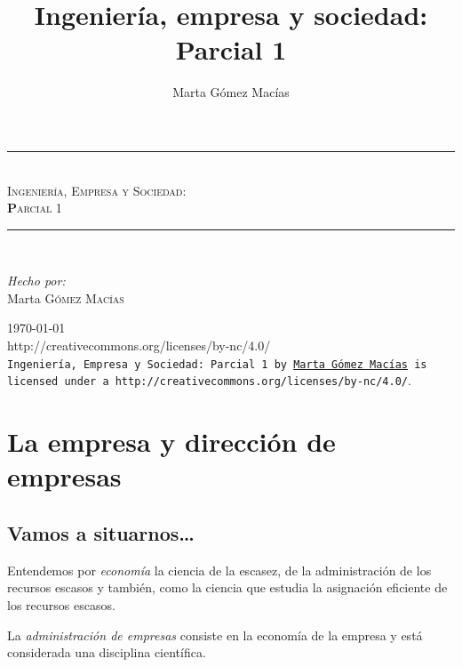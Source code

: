 \documentclass[12pt,a4paper,spanish]{report}
\title{Ingeniería, empresa y sociedad: \\ Parcial 1}
\author{Marta Gómez Macías}
\newcommand{\HRule}{\rule{\linewidth}{0.5mm}} %
\begin{document}
	 
	\begin{titlepage}
		\begin{center}
			\HRule \\[0.4cm]
			\textsc{\LARGE \textcolor[rgb]{0.5,0.8,0.9}Ingeniería, \textcolor[rgb]{0.5,0.6,0.9}Empresa y \textcolor[rgb]{0.3,0.8,0.9}Sociedad:}\\[1.5cm]
			\textsc{\Large \textbf{P}arcial 1}\\[0.5cm]
			\HRule \\[1.5cm]
			\begin{flushleft}
				\emph{Hecho por:}\\
				Marta \textsc{Gómez Macías}
			\end{flushleft}
			\vspace{10cm}
			{\Large \today}
			\vspace{5mm}
			\\
	      {http://creativecommons.org/licenses/by-nc/4.0/}\\
	      \texttt{Ingeniería, Empresa y Sociedad: Parcial 1 by 
	      \href{mailto:mgmacias95@gmail.com}{Marta Gómez Macías}
	      is licensed under a 
	      {http://creativecommons.org/licenses/by-nc/4.0/}}.
		\end{center}
	\end{titlepage}

	\tableofcontents

\chapter{\textcolor[rgb]{0.5,0.8,0.9}{La empresa y dirección de empresas}}
	\section{\textcolor[rgb]{0.5,0.8,0.9}{V}amos a situarnos\ldots}

		Entendemos por \textcolor[rgb]{0.5,0.8,0.9}{\emph{economía}} la ciencia de la escasez, de la administración de los recursos escasos y también, como la ciencia que estudia la asignación eficiente de los recursos escasos.

		La \textcolor[rgb]{0.5,0.8,0.9}{\emph{administración de empresas}} consiste en la economía de la empresa y está considerada una disciplina científica.
\end{document}
